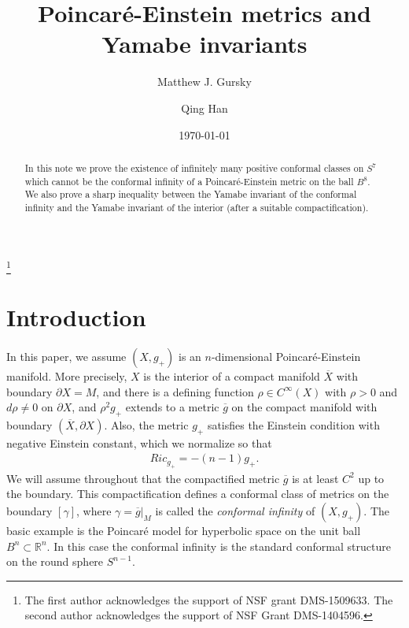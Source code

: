 \documentclass{amsart}
\title{Poincar\'e-Einstein metrics and Yamabe invariants}
\author{Matthew J. Gursky}
\author{Qing Han}
\theoremstyle{definition}
\theoremstyle{remark}
\numberwithin{equation}{section}
\begin{document}
\date{\today}

\begin{abstract}
In this note we prove the existence of infinitely many positive conformal
classes on $S^7$ which cannot be the conformal infinity of a Poincar\'e-Einstein metric on the ball $B^8$.  We also
prove a sharp inequality between the Yamabe invariant of the conformal infinity and the Yamabe invariant of the interior
(after a suitable compactification).
\end{abstract}


\thanks{The first author acknowledges the support of NSF grant DMS-1509633.  The second author acknowledges the support of NSF
Grant DMS-1404596.  }



\maketitle






\section{Introduction} \label{Intro}

In this paper, we assume $(X, g_{+})$ is an $n$-dimensional Poincar\'e-Einstein manifold.  More precisely, $X$ is the interior of a compact manifold $\overline{X}$ with
boundary $\partial X = M$, and there is a defining function $\rho \in C^{\infty}(X)$ with $\rho > 0$ and $d\rho \neq 0$ on $\partial X$, and $\rho^2 g_{+}$ extends to a metric
$\overline{g}$ on the compact manifold with boundary $(\overline{X},\partial X)$.  Also, the metric $g_{+}$ satisfies the Einstein condition with negative Einstein constant, which we normalize so that
\begin{align} \label{PEdef}
Ric_{g_{+}} = - (n-1) g_{+}.
\end{align}
We will assume throughout that the compactified metric $\overline{g}$ is at least $C^2$ up to the boundary.  This compactification
defines a conformal class of metrics on the boundary $[ \gamma ]$, where $\gamma = \overline{g} \big|_{M}$ is called the {\em conformal infinity} of $(X,g_{+})$. The basic example is the Poincar\'e model for hyperbolic space on the unit ball $B^n \subset \mathbb{R}^n$.  In this case the conformal infinity is the standard conformal structure on the round sphere $S^{n-1}$.
\end{document}
